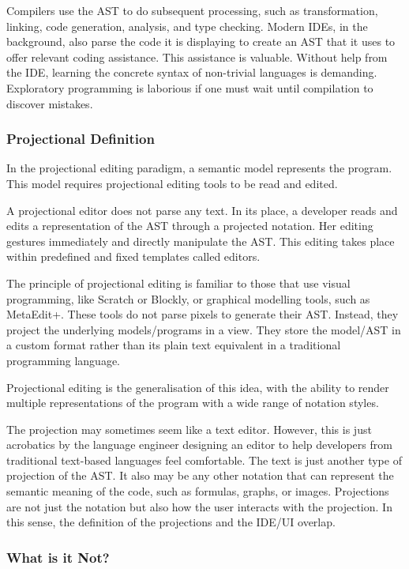 Compilers use the AST to do subsequent processing, such as transformation, linking, code generation, analysis, and type checking.
Modern IDEs, in the background, also parse the code it is displaying to create an AST that it uses to offer relevant coding assistance.
This assistance is valuable.
Without help from the IDE, learning the concrete syntax of non-trivial languages is demanding.
Exploratory programming is laborious if one must wait until compilation to discover mistakes.

\subsubsection{Projectional Definition}

In the projectional editing paradigm, a semantic model represents the program.
This model requires projectional editing tools to be read and edited.

A projectional editor does not parse any text.
In its place, a developer reads and edits a representation of the AST through a projected notation.
Her editing gestures immediately and directly manipulate the AST.
This editing takes place within predefined and fixed templates called editors.

The principle of projectional editing is familiar to those that use visual programming, like Scratch or Blockly, or graphical modelling tools, such as MetaEdit+.
These tools do not parse pixels to generate their AST.
Instead, they project the underlying models/programs in a view.
They store the model/AST in a custom format rather than its plain text equivalent in a traditional programming language.

Projectional editing is the generalisation of this idea, with the ability to render multiple representations of the program with a wide range of notation styles.

The projection may sometimes seem like a text editor. 
However, this is just acrobatics by the language engineer designing an editor to help developers from traditional text-based languages feel comfortable.
The text is just another type of projection of the AST.
It also may be any other notation that can represent the semantic meaning of the code, such as formulas, graphs, or images.
Projections are not just the notation but also how the user interacts with the projection.
In this sense, the definition of the projections and the IDE/UI overlap.

\subsubsection{What is it Not?}

